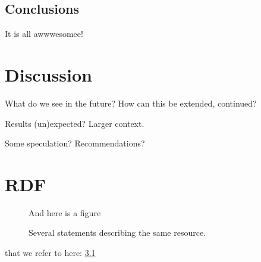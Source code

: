 \documentclass[a4paper,11pt]{kth-mag}
\begin{document}
\section{Conclusions}

It is all awwwesomee!

\pagestyle{newchap}
\chapter{Discussion}

What do we see in the future? How can this be extended, continued?

Results (un)expected? Larger context.

Some speculation? Recommendations?

\appendix
\addappheadtotoc
\chapter{RDF}\label{appA}

\begin{figure}[ht]
\begin{center}
And here is a figure
\caption{\small{Several statements describing the same resource.}}\label{RDF_4}
\end{center}
\end{figure}

that we refer to here: \ref{RDF_4}
\end{document}

